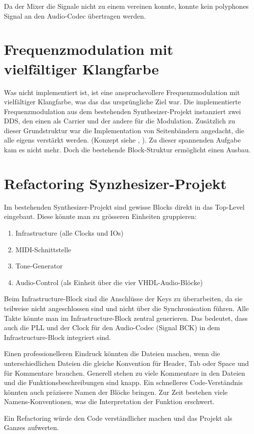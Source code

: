 Da der Mixer die Signale nicht zu einem vereinen konnte, konnte kein polyphones Signal an den Audio-Codec übertragen werden. 

\section{Frequenzmodulation mit vielfältiger Klangfarbe}

Was nicht implementiert ist, ist eine anspruchsvollere Frequenzmodulation mit vielfältiger Klangfarbe, was das das ursprüngliche Ziel war. Die implementierte Frequenzmodulation aus dem bestehenden Synthesizer-Projekt instanziert zwei DDS, den einen als Carrier und der andere für die Modulation. Zusätzlich zu dieser Grundstruktur war die Implementation von Seitenbändern angedacht, die alle eigens verstärkt werden. (Konzept siehe \cite{synthesizer_1}, \cite{synthesizer_2}). Zu dieser spannenden Aufgabe kam es nicht mehr. Doch die bestehende Block-Struktur ermöglicht einen Ausbau.

\section{Refactoring Synzhesizer-Projekt}

Im bestehenden Synthesizer-Projekt sind gewisse Blocks direkt in das Top-Level eingebaut. Diese könnte man zu grösseren Einheiten gruppieren:
\begin{enumerate}
 \item Infrastructure (alle Clocks und IOs)
 \item MIDI-Schnittstelle
 \item Tone-Generator
 \item Audio-Control (als Einheit über die vier VHDL-Audio-Blöcke)
\end{enumerate}

Beim Infrastructure-Block sind die Anschlüsse der Keys zu überarbeiten, da sie teilweise nicht angeschlossen sind und nicht über die Synchronisation führen. Alle Takte könnte man im Infrastructure-Block zentral generieren. Das bedeutet, dass auch die PLL und der Clock für den Audio-Codec (Signal BCK) in dem Infrastructure-Block integriert sind.

Einen professionelleren Eindruck könnten die Dateien machen, wenn die unterschiedlichen Dateien die gleiche Konvention für Header, Tab oder Space und für Kommentare brauchen. Generell stehen zu viele Kommentare in den Dateien und die Funktionsbeschreibungen sind knapp. Ein schnelleres Code-Verständnis könnten auch präzisere Namen der Blöcke bringen. Zur Zeit bestehen viele Namens-Konventionen, was die Interpretation der Funktion erschwert.

Ein Refactoring würde den Code verständlicher machen und das Projekt als Ganzes aufwerten.

